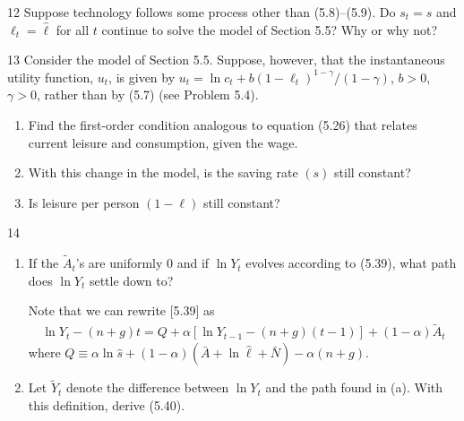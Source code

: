 \begin{problem}{12}
Suppose technology follows some process other than (5.8)--(5.9). Do \(s_t=\hat{s}\) and \(\ell_t=\hat{\ell}\) for all \(t\) continue to solve the model of Section 5.5? Why or why not?
\end{problem}

\begin{problem}{13}
Consider the model of Section 5.5. Suppose, however, that the instantaneous utility function, \(u_t\), is given by \(u_t=\ln c_t+b\left(1-\ell_t\right)^{1-\gamma}/\left(1-\gamma\right)\), \(b>0\), \(\gamma>0\), rather than by (5.7) (see Problem 5.4).
\begin{enumerate}[label=(\alph*)]
    \item Find the first-order condition analogous to equation (5.26) that relates current leisure and consumption, given the wage.
    \item With this change in the model, is the saving rate \(\left(s\right)\) still constant?
    \item Is leisure per person \(\left(1-\ell\right)\) still constant?
\end{enumerate}
\end{problem}

\begin{problem}{14}
\begin{enumerate}[label=(\alph*)]
    \item If the \(\tilde{A}_t\)'s are uniformly 0 and if \(\ln Y_t\) evolves according to (5.39), what path does \(\ln Y_t\) settle down to?
    \par {} Note that we can rewrite [5.39] as \
    \begin{align*}
        \ln Y_t-\left(n+g\right)t=Q+\alpha\left[\ln Y_{t-1}-\left(n+g\right)\left(t-1\right)\right]+\left(1-\alpha\right)\tilde{A}_t
    \end{align*}
    where \(Q\equiv\alpha\ln\hat{s}+\left(1-\alpha\right)\left(\bar{A}+\ln\hat{\ell}+\bar{N}\right)-\alpha\left(n+g\right)\).
    \item Let \(\tilde{Y}_t\) denote the difference between \(\ln Y_t\) and the path found in (a). With this definition, derive (5.40).
\end{enumerate}
\end{problem}

